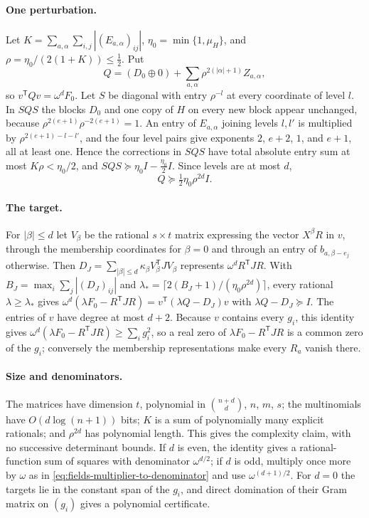 \paragraph{One perturbation.}
Let $K=\sum_{a,\alpha}\sum_{i,j}|(E_{a,\alpha})_{ij}|$,
$\eta_0=\min\{1,\mu_H\}$, and $\rho=\eta_0/(2(1+K))\le\frac12$. Put
\[
 Q=(D_0\oplus0)+\sum_{a,\alpha}\rho^{2(|\alpha|+1)}Z_{a,\alpha},
\]
so $v^{\mathsf T}Qv=\omega^dF_0$. Let $S$ be diagonal with entry $\rho^{-l}$
at every coordinate of level $l$. In $SQS$ the blocks $D_0$ and one copy of
$H$ on every new block appear unchanged, because
$\rho^{2(e+1)}\rho^{-2(e+1)}=1$. An entry of $E_{a,\alpha}$ joining levels
$l,l'$ is multiplied by $\rho^{2(e+1)-l-l'}$, and the four level pairs give
exponents $2$, $e+2$, $1$, and $e+1$, all at least one. Hence the corrections
in $SQS$ have total absolute entry sum at most $K\rho<\eta_0/2$, and
$SQS\succeq\eta_0I-\frac{\eta_0}2I$. Since levels are at most $d$,
\[
 Q\succeq\tfrac12\eta_0\rho^{2d}I .
\]

\paragraph{The target.}
For $|\beta|\le d$ let $V_\beta$ be the rational $s\times t$ matrix expressing
the vector $X^\beta R$ in $v$, through the membership coordinates for
$\beta=0$ and through an entry of $b_{a,\beta-e_j}$ otherwise. Then
$D_J=\sum_{|\beta|\le d}\kappa_\beta V_\beta^{\mathsf T}JV_\beta$ represents
$\omega^dR^{\mathsf T}JR$. With $B_J=\max_i\sum_j|(D_J)_{ij}|$ and
$\lambda_*=\lceil2(B_J+1)/(\eta_0\rho^{2d})\rceil$, every rational
$\lambda\ge\lambda_*$ gives
$\omega^d(\lambda F_0-R^{\mathsf T}JR)=v^{\mathsf T}(\lambda Q-D_J)v$ with
$\lambda Q-D_J\succeq I$. The entries of $v$ have degree at most $d+2$.
Because $v$ contains every $g_i$, this identity gives
$\omega^d(\lambda F_0-R^{\mathsf T}JR)\ge\sum_ig_i^2$, so a real zero of
$\lambda F_0-R^{\mathsf T}JR$ is a common zero of the $g_i$; conversely the
membership representations make every $R_a$ vanish there.

\paragraph{Size and denominators.}
The matrices have dimension $t$, polynomial in $\binom{n+d}d$, $n$, $m$, $s$;
the multinomials have $O(d\log(n+1))$ bits; $K$ is a sum of polynomially many
explicit rationals; and $\rho^{2d}$ has polynomial length. This gives the
complexity claim, with no successive determinant bounds. If $d$ is even, the
identity gives a rational-function sum of squares with denominator
$\omega^{d/2}$; if $d$ is odd, multiply once more by $\omega$ as in
\eqref{eq:fields-multiplier-to-denominator} and use $\omega^{(d+1)/2}$. For
$d=0$ the targets lie in the constant span of the $g_i$, and direct domination
of their Gram matrix on $(g_i)$ gives a polynomial certificate.

